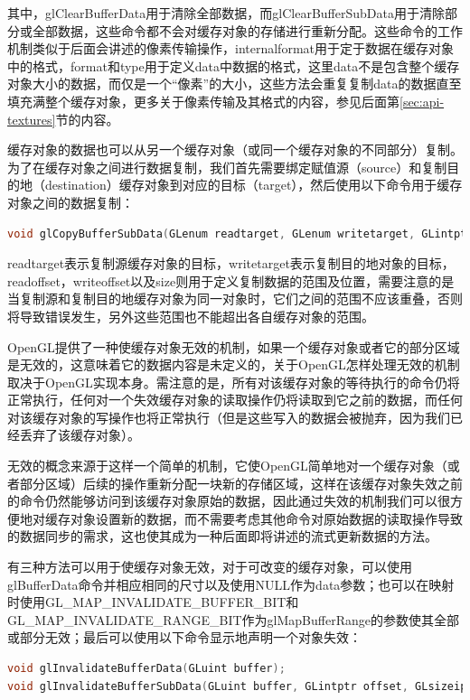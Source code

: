 其中，glClearBufferData用于清除全部数据，而glClearBufferSubData用于清除部分或全部数据，这些命令都不会对缓存对象的存储进行重新分配。这些命令的工作机制类似于后面会讲述的像素传输操作，internalformat用于定于数据在缓存对象中的格式，format和type用于定义data中数据的格式，这里data不是包含整个缓存对象大小的数据，而仅是一个“像素”的大小，这些方法会重复复制data的数据直至填充满整个缓存对象，更多关于像素传输及其格式的内容，参见后面第\ref{sec:api-textures}节的内容。
 
缓存对象的数据也可以从另一个缓存对象（或同一个缓存对象的不同部分）复制。为了在缓存对象之间进行数据复制，我们首先需要绑定赋值源（source）和复制目的地（destination）缓存对象到对应的目标（target），然后使用以下命令用于缓存对象之间的数据复制：

\begin{lstlisting}[language=C++]
void glCopyBufferSubData​(GLenum readtarget​, GLenum writetarget​, GLintptr readoffset​, GLintptr writeoffset​, GLsizeiptr size​);
\end{lstlisting}

readtarget表示复制源缓存对象的目标，writetarget表示复制目的地对象的目标，readoffset，writeoffset以及size则用于定义复制数据的范围及位置，需要注意的是当复制源和复制目的地缓存对象为同一对象时，它们之间的范围不应该重叠，否则将导致错误发生，另外这些范围也不能超出各自缓存对象的范围。

OpenGL提供了一种使缓存对象无效的机制，如果一个缓存对象或者它的部分区域是无效的，这意味着它的数据内容是未定义的，关于OpenGL怎样处理无效的机制取决于OpenGL实现本身。需注意的是，所有对该缓存对象的等待执行的命令仍将正常执行，任何对一个失效缓存对象的读取操作仍将读取到它之前的数据，而任何对该缓存对象的写操作也将正常执行（但是这些写入的数据会被抛弃，因为我们已经丢弃了该缓存对象）。

无效的概念来源于这样一个简单的机制，它使OpenGL简单地对一个缓存对象（或者部分区域）后续的操作重新分配一块新的存储区域，这样在该缓存对象失效之前的命令仍然能够访问到该缓存对象原始的数据，因此通过失效的机制我们可以很方便地对缓存对象设置新的数据，而不需要考虑其他命令对原始数据的读取操作导致的数据同步的需求，这也使其成为一种后面即将讲述的流式更新数据的方法。

有三种方法可以用于使缓存对象无效，对于可改变的缓存对象，可以使用glBufferData​命令并相应相同的尺寸以及使用NULL作为data参数；也可以在映射时使用GL\_MAP\_INVALIDATE\_BUFFER\_BIT和GL\_MAP\_INVALIDATE\_RANGE\_BIT作为glMapBufferRange​的参数使其全部或部分无效；最后可以使用以下命令显示地声明一个对象失效：

\begin{lstlisting}[language=C++]
void glInvalidateBufferData​(GLuint buffer​);
void glInvalidateBufferSubData​(GLuint buffer​, GLintptr offset​, GLsizeiptr length​);
\end{lstlisting}






